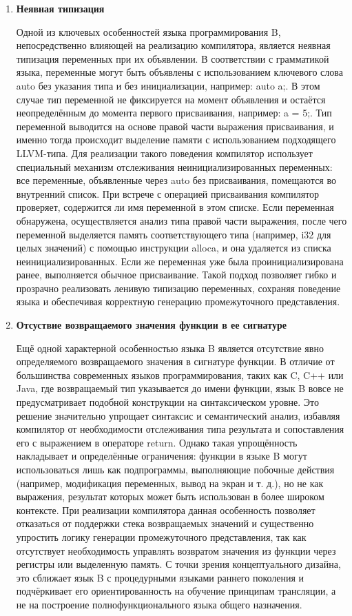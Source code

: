 \begin{enumerate}
	\item \textbf{Неявная типизация}

	Одной из ключевых особенностей языка программирования B, непосредственно влияющей на реализацию компилятора, является неявная типизация переменных при их объявлении. 
	В соответствии с грамматикой языка, переменные могут быть объявлены с использованием ключевого слова auto без указания типа и без инициализации, например: auto a;. 
	В этом случае тип переменной не фиксируется на момент объявления и остаётся неопределённым до момента первого присваивания, например: a = 5;. 
	Тип переменной выводится на основе правой части выражения присваивания, и именно тогда происходит выделение памяти с использованием подходящего LLVM-типа. 
	Для реализации такого поведения компилятор использует специальный механизм отслеживания неинициализированных переменных: все переменные, объявленные через auto без присваивания, помещаются во внутренний список. 
	При встрече с операцией присваивания компилятор проверяет, содержится ли имя переменной в этом списке. Если переменная обнаружена, осуществляется анализ типа правой части выражения, после чего переменной выделяется память соответствующего типа (например, i32 для целых значений) с помощью инструкции alloca, и она удаляется из списка неинициализированных. 
	Если же переменная уже была проинициализирована ранее, выполняется обычное присваивание. 
	Такой подход позволяет гибко и прозрачно реализовать ленивую типизацию переменных, сохраняя поведение языка и обеспечивая корректную генерацию промежуточного представления.

	\item \textbf{Отсуствие возвращаемого значения функции в ее сигнатуре}

	Ещё одной характерной особенностью языка B является отсутствие явно определяемого возвращаемого значения в сигнатуре функции. 
	В отличие от большинства современных языков программирования, таких как C, C++ или Java, где возвращаемый тип указывается до имени функции, язык B вовсе не предусматривает подобной конструкции на синтаксическом уровне. 
	Это решение значительно упрощает синтаксис и семантический анализ, избавляя компилятор от необходимости отслеживания типа результата и сопоставления его с выражением в операторе return. 
	Однако такая упрощённость накладывает и определённые ограничения: функции в языке B могут использоваться лишь как подпрограммы, выполняющие побочные действия (например, модификация переменных, вывод на экран и т. д.), но не как выражения, результат которых может быть использован в более широком контексте. 
	При реализации компилятора данная особенность позволяет отказаться от поддержки стека возвращаемых значений и существенно упростить логику генерации промежуточного представления, так как отсутствует необходимость управлять возвратом значения из функции через регистры или выделенную память. 
	С точки зрения концептуального дизайна, это сближает язык B с процедурными языками раннего поколения и подчёркивает его ориентированность на обучение принципам трансляции, а не на построение полнофункционального языка общего назначения.


\end{enumerate}
